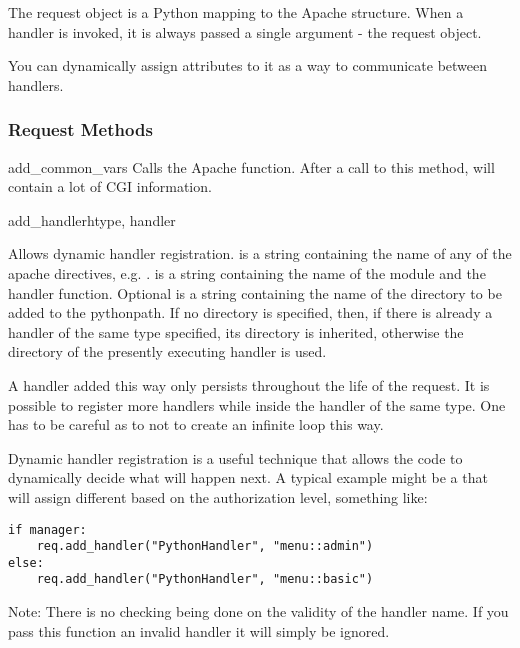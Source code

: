 The request object is a Python mapping to the Apache
 structure. When a handler is invoked, it is always
passed a single argument - the request object. 

You can dynamically assign attributes to it as a way to communicate
between handlers.

\subsubsection{Request Methods\label{pyapi-mprequest-meth}}

\begin{methoddesc}[Request]{add_common_vars}{}
Calls the Apache  function. After a
call to this method,  will contain a
lot of CGI information.
\end{methoddesc}

\begin{methoddesc}[Request]{add_handler}{htype, handler}

Allows dynamic handler registration.  is a string
containing the name of any of the apache 
directives, e.g. .  is a string
containing the name of the module and the handler function.  Optional
 is a string containing the name of the directory to be added
to the pythonpath. If no directory is specified, then, if there is
already a handler of the same type specified, its directory is
inherited, otherwise the directory of the presently executing handler
is used.
                  
A handler added this way only persists throughout the life of the
request. It is possible to register more handlers while inside the
handler of the same type. One has to be careful as to not to create an
infinite loop this way.

Dynamic handler registration is a useful technique that allows the
code to dynamically decide what will happen next. A typical example
might be a  that will assign different
 based on the authorization level, something like:

\begin{verbatim}
if manager:
    req.add_handler("PythonHandler", "menu::admin")
else:
    req.add_handler("PythonHandler", "menu::basic")
\end{verbatim}                              

Note: There is no checking being done on the validity of the handler
name. If you pass this function an invalid handler it will simply be
ignored.
\end{methoddesc}

